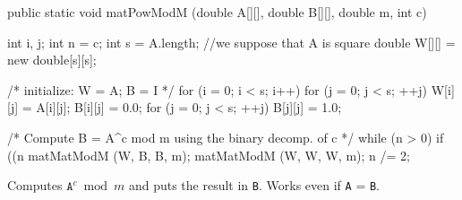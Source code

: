 \begin{code}

   public static void matPowModM (double A[][], double B[][], double m,
                                  int c) \begin{hide} {
      int i, j;
      int n = c;
      int s = A.length;   //we suppose that A is square
      double W[][] = new double[s][s];

      /* initialize: W = A; B = I */
      for (i = 0; i < s; i++) {
         for (j = 0; j < s;  ++j)  {
            W[i][j] = A[i][j];
            B[i][j] = 0.0;
         }
      }
      for (j = 0; j < s;  ++j)
         B[j][j] = 1.0;

      /* Compute B = A^c mod m using the binary decomp. of c */
      while (n > 0) {
         if ((n %
            matMatModM (W, B, B, m);
         matMatModM (W, W, W, m);
         n /= 2;
      }
   } \end{hide}
\end{code}
\begin{tabb} Computes $\mathtt{A}^{c} \bmod m$
  and puts the result in \texttt{B}.
  Works even if \texttt{A} = \texttt{B}.
\end{tabb}
\begin{htmlonly}
\end{htmlonly}



